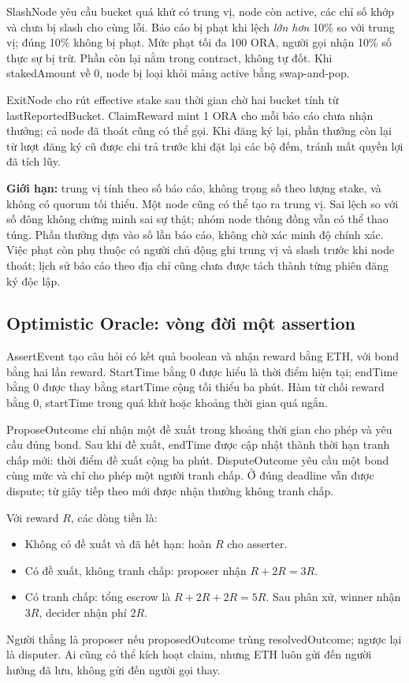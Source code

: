 SlashNode yêu cầu bucket quá khứ có trung vị, node còn active, các chỉ số khớp và chưa bị slash cho cùng lỗi. Báo cáo bị phạt khi lệch \emph{lớn hơn} 10\% so với trung vị; đúng 10\% không bị phạt. Mức phạt tối đa 100 ORA, người gọi nhận 10\% số thực sự bị trừ. Phần còn lại nằm trong contract, không tự đốt. Khi stakedAmount về 0, node bị loại khỏi mảng active bằng swap-and-pop.

ExitNode cho rút effective stake sau thời gian chờ hai bucket tính từ lastReportedBucket. ClaimReward mint 1 ORA cho mỗi báo cáo chưa nhận thưởng; cả node đã thoát cũng có thể gọi. Khi đăng ký lại, phần thưởng còn lại từ lượt đăng ký cũ được chi trả trước khi đặt lại các bộ đếm, tránh mất quyền lợi đã tích lũy.

\textbf{Giới hạn:} trung vị tính theo số báo cáo, không trọng số theo lượng stake, và không có quorum tối thiểu. Một node cũng có thể tạo ra trung vị. Sai lệch so với số đông không chứng minh sai sự thật; nhóm node thông đồng vẫn có thể thao túng. Phần thưởng dựa vào số lần báo cáo, không chờ xác minh độ chính xác. Việc phạt còn phụ thuộc có người chủ động ghi trung vị và slash trước khi node thoát; lịch sử báo cáo theo địa chỉ cũng chưa được tách thành từng phiên đăng ký độc lập.

\subsection{Optimistic Oracle: vòng đời một assertion}

AssertEvent tạo câu hỏi có kết quả boolean và nhận reward bằng ETH, với bond bằng hai lần reward. StartTime bằng 0 được hiểu là thời điểm hiện tại; endTime bằng 0 được thay bằng startTime cộng tối thiểu ba phút. Hàm từ chối reward bằng 0, startTime trong quá khứ hoặc khoảng thời gian quá ngắn.

ProposeOutcome chỉ nhận một đề xuất trong khoảng thời gian cho phép và yêu cầu đúng bond. Sau khi đề xuất, endTime được cập nhật thành thời hạn tranh chấp mới: thời điểm đề xuất cộng ba phút. DisputeOutcome yêu cầu một bond cùng mức và chỉ cho phép một người tranh chấp. Ở đúng deadline vẫn được dispute; từ giây tiếp theo mới được nhận thưởng không tranh chấp.

Với reward $R$, các dòng tiền là:
\begin{itemize}
    \item Không có đề xuất và đã hết hạn: hoàn $R$ cho asserter.
    \item Có đề xuất, không tranh chấp: proposer nhận $R+2R=3R$.
    \item Có tranh chấp: tổng escrow là $R+2R+2R=5R$. Sau phân xử, winner nhận $3R$, decider nhận phí $2R$.
\end{itemize}
Người thắng là proposer nếu proposedOutcome trùng resolvedOutcome; ngược lại là disputer. Ai cũng có thể kích hoạt claim, nhưng ETH luôn gửi đến người hưởng đã lưu, không gửi đến người gọi thay.

